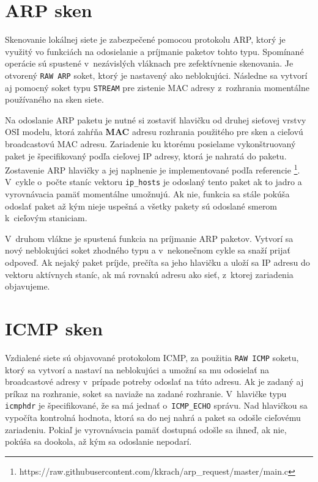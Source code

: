 \newpage

\section{ARP sken}
Skenovanie lokálnej siete je zabezpečené pomocou protokolu ARP, ktorý je využitý vo funkciách na odosielanie a príjmanie paketov tohto typu. Spomínané operácie sú spustené v~nezávislých vláknach pre zefektívnenie skenovania. Je otvorený \texttt{RAW ARP} soket, ktorý je nastavený ako neblokujúci. Následne sa vytvorí aj pomocný soket typu \texttt{STREAM} pre zistenie MAC adresy z~rozhrania momentálne používaného na sken siete.

Na odoslanie ARP paketu je nutné si zostaviť hlavičku od druhej sieťovej vrstvy OSI modelu, ktorá zahŕňa \textbf{MAC} adresu rozhrania použitého pre sken a cieľovú broadcastovú MAC adresu. Zariadenie ku ktorému posielame vykonštruovaný paket je špecifikovaný podľa cieľovej IP adresy, ktorá je nahratá do paketu.
Zostavenie ARP hlavičky a jej naplnenie je implementované podľa referencie \footnote{https://raw.githubusercontent.com/kkrach/arp\_request/master/main.c}.
V~cykle o~počte staníc vektoru \texttt{ip\_hosts} je odoslaný tento paket ak to jadro a vyrovnávacia pamäť momentálne umožnujú. Ak nie, funkcia sa stále pokúša odoslať paket až kým nieje uspešná a všetky pakety sú odoslané smerom k~cieľovým staniciam.

V~druhom vlákne je spustená funkcia na príjmanie ARP paketov. Vytvorí sa nový neblokujúci soket zhodného typu a v~nekonečnom cykle sa snaží prijať odpoveď. Ak nejaký paket príjde, prečíta sa jeho hlavičku a uloží sa IP adresu do vektoru aktívnych staníc, ak má rovnakú adresu ako sieť, z~ktorej zariadenia objavujeme.


\section{ICMP sken}
Vzdialené siete sú objavované protokolom ICMP, za použitia \texttt{RAW ICMP} soketu, ktorý sa vytvorí a nastaví na neblokujúci a umožní sa mu odosielať na broadcastové adresy v~prípade potreby odoslať na túto adresu. Ak je zadaný aj príkaz na rozhranie, soket sa naviaže na zadané rozhranie. V~hlavičke typu \texttt{icmphdr} je špecifikované, že sa má jednať o~\texttt{ICMP\_ECHO} správu. Nad hlavičkou sa vypočíta kontrolná hodnota, ktorá sa do nej nahrá a paket sa odošle cieľovému zariadeniu. Pokiaľ je vyrovnávacia pamäť dostupná odošle sa ihneď, ak nie, pokúša sa dookola, až kým sa odoslanie nepodarí. 

